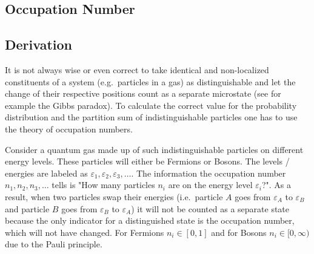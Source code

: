 \documentclass[a4paper,10pt]{article}
\numberwithin{equation}{section}
\begin{document}
\begin{multicols}{2}


\section{Occupation Number}
\subsection{Derivation}
It is not always wise or even correct to take identical and non-localized constituents of a system (e.g.\ particles in a gas) as distinguishable and let the change of their respective positions count as a separate microstate (see for example the Gibbs paradox).
To calculate the correct value for the probability distribution and the partition sum of indistinguishable particles one has to use the theory of occupation numbers.

Consider a quantum gas made up of such indistinguishable particles on different energy levels.
These particles will either be Fermions or Bosons.
The levels / energies are labeled as $\varepsilon _1,\varepsilon _2,\varepsilon _3,\hdots $.
The information the occupation number $n_1,n_2,n_3,\hdots $ tells is "How many particles $n_i$ are on the energy level $\varepsilon _i$?".
As a result, when two particles swap their energies (i.e.\ particle $A$ goes from $\varepsilon _A$ to $\varepsilon _B$ and particle $B$ goes from $\varepsilon _B$ to $\varepsilon _A$) it will not be counted as a separate state because the only indicator for a distinguished state is the occupation number, which will not have changed.
For Fermions $n_i  \in \left[0,1\right]$ and for Bosons $n_i  \in [0,\infty)$ due to the Pauli principle.


\end{multicols}
\end{document}
